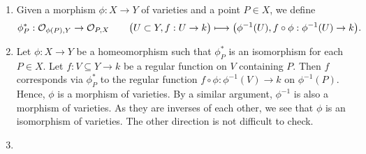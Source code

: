 \documentclass[10pt]{amsart}
\begin{document}
\begin{solution}
    \begin{luke}
        \begin{enumerate}
            \item Given a morphism $\phi: X \to Y$ of varieties and a point $P \in X$, 
            we define
            \[
                \phi_P^* : \mathcal{O}_{\phi(P), Y} \to \mathcal{O}_{P, X} \qquad \big(U \subset Y, f: U \to k \big) \longmapsto 
                \big(\phi^{-1}(U), f \circ \phi: \phi^{-1}(U) \to k\big).
            \]

            \item Let $\phi: X \to Y$ be a homeomorphism such that $\phi_P^{*}$ is an isomorphism 
            for each $P \in X$. Let
            $f: V \subseteq Y \to k$ be a regular function on $V$ containing $P$.
            Then $f$ corresponds via $\phi_P^*$ to the regular function 
            $f \circ \phi: \phi^{-1}(V) \to k$ on $\phi^{-1}(P)$. 
            Hence, $\phi$ is a morphism of varieties. By a similar argument, $\phi^{-1}$ is also a morphism of varieties. 
            As they are inverses of each other, we see that $\phi$ is an isomorphism of varieties. 
            The other direction is not difficult to check.

            \item 
            
        \end{enumerate}
    \end{luke}
\end{solution}
\end{document}
